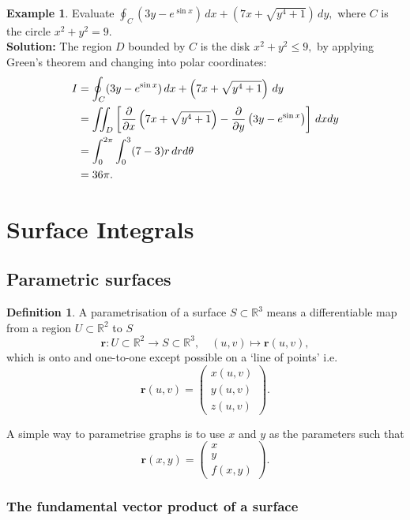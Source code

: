 \documentclass[12pt, a4paper]{article}
\newcommand{\bb}[1]{\mathbb{#1}}
\newcommand{\f}[2]{\frac{#1}{#2}}
\newcommand{\mb}[1]{\mathbf{#1}}
\theoremstyle{definition}
\newtheorem{definition}{Definition}[section]
\newtheorem*{example}{Example}
\theoremstyle{plain}
\begin{document}
\begin{example}
Evaluate $\oint_C(3y-e^{\sin{x}}) \, dx+\left(7x+\sqrt{y^4+1}\right) \, dy,$ where $C$ is the circle $x^2+y^2=9.$ \\
\textbf{Solution:}  The region $D$ bounded by $C$ is the disk $x^2 + y^2 \leq 9,$ by applying Green's theorem and changing into polar coordinates: 
$$\begin{aligned}
I&=\oint_C(3y-e^{\sin{x}}) \, dx+\left(7x+\sqrt{y^4+1}\right) \, dy \\
&=\iint_D\left[\pdv{}{x}\left(7x+\sqrt{y^4+1}\right)-\pdv{}{y}\left(3y-e^{\sin{x}}\right)\right] \, dxdy \\
&=\int_0^{2\pi}\int_0^3 (7-3) r\, drd\theta \\
&= 36\pi.
\end{aligned}$$
\end{example}

\section{Surface Integrals}

\subsection{Parametric surfaces}

\begin{definition}
A parametrisation of a surface $S \subset \bb{R}^3$ means a differentiable map from a region $U \subset \bb{R}^2$ to $S$ $$\mb{r}:U\subset \bb{R}^2 \to S\subset \bb{R}^3, \quad (u,v)\mapsto \mb{r}(u,v),$$ which is onto and one-to-one except possible on a `line of points' i.e. $$\mb{r}(u,v)=\begin{pmatrix} x(u,v)\\y(u,v) \\z(u,v) \end{pmatrix}.$$
\end{definition}

A simple way to parametrise graphs is to use $x$ and $y$ as the parameters such that $$\mb{r}(x,y) = \begin{pmatrix} x\\y\\f(x,y) \end{pmatrix}.$$

\subsubsection{The fundamental vector product of a surface}
\end{document}
